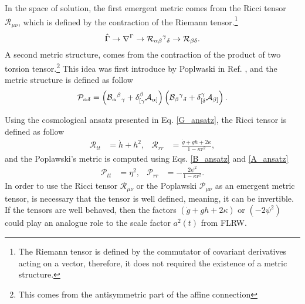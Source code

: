 In the space of solution, the first emergent metric comes from the Ricci tensor $\mathcal{R}_{\mu\nu}$, which is 
defined by the contraction of the Riemann tensor.\footnote{The Riemann tensor is defined 
by the commutator of covariant derivatives acting on a vector, therefore, it does not 
required the existence of a metric structure.} 
\begin{equation}
    \label{chain}
    \hat{\Gamma} \to \nabla^{\Gamma} \to \mathcal{R}_{\alpha\beta}{}^{ \gamma}{}_{\delta} \to \mathcal{R}_{\beta\delta}.
\end{equation}
A second metric structure, comes from the contraction of the product of two torsion 
tensor.\footnote{This comes from the antisymmetric part of the affine connection} 
This idea was first introduce by Poplwaski in Ref. \cite{Pop_awski_2013}, and the metric 
structure is defined as follow
\begin{equation}
    \mathcal{P}_{\alpha\delta} = \left(\mathcal{B}_{\alpha}{}^{ \beta}{}_{\gamma} + \delta^{\beta}_{[\gamma}\mathcal{A}_{\alpha]}\right)\left(\mathcal{B}_{\beta}{}^{ \gamma}{}_{\delta} + \delta^{\gamma}_{[\delta}\mathcal{A}_{\beta]}\right).
\end{equation}

Using the cosmological ansatz presented in Eq. \eqref{G_ansatz}, the Ricci tensor is 
defined as follow
\begin{align}
    \label{Ricci_tensor}
    \mathcal{R}_{tt} & = \dot{h} + h^2, & \mathcal{R}_{rr} & = \frac{\dot{g} + gh + 2\kappa}{1 - \kappa r^2},
\end{align}
and the Poplawski's metric is computed using Eqs. \eqref{B_ansatz} and \eqref{A_ansatz}
\begin{align}
    \label{Pop_tensor}
    \mathcal{P}_{tt} & = \eta^2, & \mathcal{P}_{rr} & = -\frac{2\psi^2}{1 - \kappa r^2}.
\end{align}
In order to use the Ricci tensor $\mathcal{R}_{\mu\nu}$ or the Poplawski $\mathcal{P}_{\mu\nu}$ as an
emergent metric tensor, is necessary that the tensor is well defined, meaning, it can be invertible. If the
tensors are well behaved, then the factors $\left(\dot{g} + gh + 2\kappa\right)$ or $\left(-2\psi^2\right)$ 
could play an analogue role to the scale factor $a^2(t)$ from FLRW.

